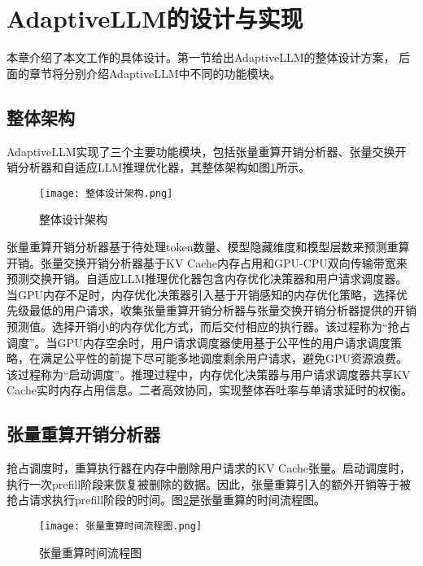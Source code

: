 \section{AdaptiveLLM的设计与实现}

本章介绍了本文工作的具体设计。第一节给出AdaptiveLLM的整体设计方案， 后面的章节将分别介绍AdaptiveLLM中不同的功能模块。

\subsection{整体架构}

AdaptiveLLM实现了三个主要功能模块，包括张量重算开销分析器、张量交换开销分析器和自适应LLM推理优化器，其整体架构如图\ref{Fig:整体设计架构}所示。

\begin{figure}[!htbp]
  \centering
  \texttt{[image: 整体设计架构.png]}
  \caption{整体设计架构}
  \label{Fig:整体设计架构}
\end{figure}

张量重算开销分析器基于待处理token数量、模型隐藏维度和模型层数来预测重算开销。张量交换开销分析器基于KV Cache内存占用和GPU-CPU双向传输带宽来预测交换开销。自适应LLM推理优化器包含内存优化决策器和用户请求调度器。当GPU内存不足时，内存优化决策器引入基于开销感知的内存优化策略，选择优先级最低的用户请求，收集张量重算开销分析器与张量交换开销分析器提供的开销预测值。选择开销小的内存优化方式，而后交付相应的执行器。该过程称为“抢占调度”。当GPU内存空余时，用户请求调度器使用基于公平性的用户请求调度策略，在满足公平性的前提下尽可能多地调度剩余用户请求，避免GPU资源浪费。该过程称为“启动调度”。推理过程中，内存优化决策器与用户请求调度器共享KV Cache实时内存占用信息。二者高效协同，实现整体吞吐率与单请求延时的权衡。

\subsection{张量重算开销分析器}

抢占调度时，重算执行器在内存中删除用户请求的KV Cache张量。启动调度时，执行一次prefill阶段来恢复被删除的数据。因此，张量重算引入的额外开销等于被抢占请求执行prefill阶段的时间。图\ref{Fig:张量重算时间流程图}是张量重算的时间流程图。

\begin{figure}[!htbp]
  \centering
  \texttt{[image: 张量重算时间流程图.png]}
  \caption{张量重算时间流程图}
  \label{Fig:张量重算时间流程图}
\end{figure}

